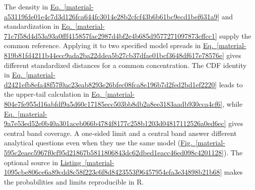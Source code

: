 \documentclass[11pt,a4paper]{article}
\begin{document}

\medskip

The density in \hyperref[material-a53119fde01e4c7d3d126fca644fc3014e28b2cfcf43b6b61bc9ecd1bef631a9]{Eq.~\ref*{material-a53119fde01e4c7d3d126fca644fc3014e28b2cfcf43b6b61bc9ecd1bef631a9}} and standardization in \hyperref[material-71c7f58d4d53a93a0fff415857fac2987d4bf2e4b685d9577271097873cffcc1]{Eq.~\ref*{material-71c7f58d4d53a93a0fff415857fac2987d4bf2e4b685d9577271097873cffcc1}} supply the common reference. Applying it to two specified model spreads in \hyperref[material-819b81fd4211b44ecc9ada2ba22ddea5b27cb37dfae01bcf3648df617e78576e]{Eq.~\ref*{material-819b81fd4211b44ecc9ada2ba22ddea5b27cb37dfae01bcf3648df617e78576e}} gives different standardized distances for a common concentration. The CDF identity in \hyperref[material-d2421efb8efa48f57f0ac23eab8293e26bfec08fca8e196b7d2fed2bd1ef2220]{Eq.~\ref*{material-d2421efb8efa48f57f0ac23eab8293e26bfec08fca8e196b7d2fed2bd1ef2220}} leads to the upper-tail calculation in \hyperref[material-804e7fe955d16abfdf9a5d60c17185ecc503bb8db2a8ee3183aadb930cca4cf6]{Eq.~\ref*{material-804e7fe955d16abfdf9a5d60c17185ecc503bb8db2a8ee3183aadb930cca4cf6}}, while \hyperref[material-9a7e53ed52e0b40a301aceb066b4784f8177c258b1203d04817112526a0ed6ec]{Eq.~\ref*{material-9a7e53ed52e0b40a301aceb066b4784f8177c258b1203d04817112526a0ed6ec}} gives central band coverage. A one-sided limit and a central band answer different analytical questions even when they use the same model (\hyperref[material-595c2eaec5967f0cf95d21867b5811806843dc62dbed1eacc46ed098c4201128]{Fig.~\ref*{material-595c2eaec5967f0cf95d21867b5811806843dc62dbed1eacc46ed098c4201128}}). The optional source in \hyperref[material-1095cbe806ce6a89cdd8c58f223c6f8d8423553f96457954efa3e34898b21b68]{Listing~\ref*{material-1095cbe806ce6a89cdd8c58f223c6f8d8423553f96457954efa3e34898b21b68}} makes the probabilities and limits reproducible in R.
\end{document}
